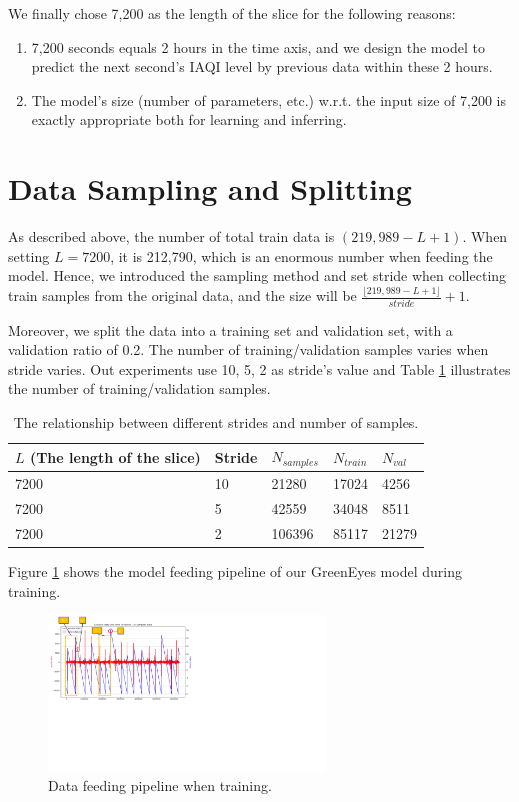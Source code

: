 We finally chose 7,200 as the length of the slice for the following reasons:
\begin{enumerate}
    \item 7,200 seconds equals 2 hours in the time axis, and we design the model to predict the next second's IAQI level by previous data within these 2 hours.
    \item The model's size (number of parameters, etc.) w.r.t. the input size of 7,200 is exactly appropriate both for learning and inferring.
\end{enumerate}

\section{Data Sampling and Splitting}

As described above, the number of total train data is $(219,989-L+1)$. When setting $L=7200$, it is 212,790, which is an enormous number when feeding the model. Hence, we introduced the sampling method and set stride when collecting train samples from the original data, and the size will be $\frac{\lfloor 219,989-L+1 \rfloor}{stride}+1$. 

Moreover, we split the data into a training set and validation set, with a validation ratio of 0.2. The number of training/validation samples varies when stride varies. Out experiments use 10, 5, 2 as stride's value and Table \ref{table:N_samples} illustrates the number of training/validation samples.

\begin{table}[!htbp]
    \centering
    \begin{tabular}{|l|l|l|l|l|}
    \hline
    $L$ (The length of the slice) & Stride & $N_{samples}$ & $N_{train}$ & $N_{val}$ \\ \hline
    7200 & 10 & 21280  & 17024  & 4256  \\ \hline
    7200 & 5  & 42559  & 34048  & 8511  \\ \hline
    7200 & 2  & 106396 & 85117  & 21279 \\ \hline
    \end{tabular}
    \caption{The relationship between different strides and number of samples.}
    \label{table:N_samples}
\end{table}

Figure \ref{fig:model_feeding_pipeline} shows the model feeding pipeline of our GreenEyes model during training.

\begin{figure}[!htbp]
    \centering
    \includegraphics[width=2.9in]{graphs/data_slicing.pdf}
    \caption{Data feeding pipeline when training.}
    \label{fig:model_feeding_pipeline}
\end{figure}

